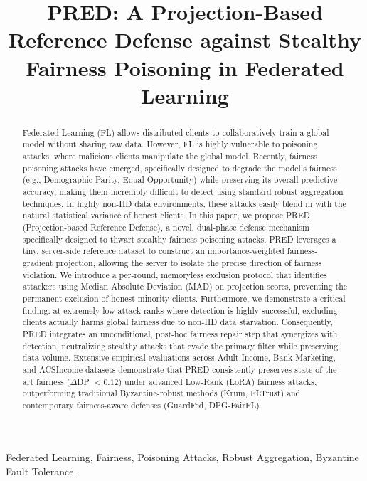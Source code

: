 \documentclass[journal]{IEEEtran}
\begin{document}
\title{PRED: A Projection-Based Reference Defense against Stealthy Fairness Poisoning in Federated Learning}

\author{
}

\maketitle

\begin{abstract}
Federated Learning (FL) allows distributed clients to collaboratively train a global model without sharing raw data. However, FL is highly vulnerable to poisoning attacks, where malicious clients manipulate the global model. Recently, fairness poisoning attacks have emerged, specifically designed to degrade the model's fairness (e.g., Demographic Parity, Equal Opportunity) while preserving its overall predictive accuracy, making them incredibly difficult to detect using standard robust aggregation techniques. In highly non-IID data environments, these attacks easily blend in with the natural statistical variance of honest clients. In this paper, we propose PRED (Projection-based Reference Defense), a novel, dual-phase defense mechanism specifically designed to thwart stealthy fairness poisoning attacks. PRED leverages a tiny, server-side reference dataset to construct an importance-weighted fairness-gradient projection, allowing the server to isolate the precise direction of fairness violation. We introduce a per-round, memoryless exclusion protocol that identifies attackers using Median Absolute Deviation (MAD) on projection scores, preventing the permanent exclusion of honest minority clients. Furthermore, we demonstrate a critical finding: at extremely low attack ranks where detection is highly successful, excluding clients actually harms global fairness due to non-IID data starvation. Consequently, PRED integrates an unconditional, post-hoc fairness repair step that synergizes with detection, neutralizing stealthy attacks that evade the primary filter while preserving data volume. Extensive empirical evaluations across Adult Income, Bank Marketing, and ACSIncome datasets demonstrate that PRED consistently preserves state-of-the-art fairness ($\Delta$DP $< 0.12$) under advanced Low-Rank (LoRA) fairness attacks, outperforming traditional Byzantine-robust methods (Krum, FLTrust) and contemporary fairness-aware defenses (GuardFed, DPG-FairFL).
\end{abstract}

\begin{IEEEkeywords}
Federated Learning, Fairness, Poisoning Attacks, Robust Aggregation, Byzantine Fault Tolerance.
\end{IEEEkeywords}
\end{document}
